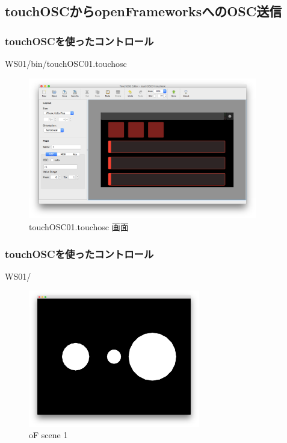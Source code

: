\documentclass[10pt, dvipdfmx]{beamer}
\begin{document}
    \subsection{touchOSCからopenFrameworksへのOSC送信}
        \begin{frame}
            \frametitle{touchOSCを使ったコントロール}
                \tiny
                WS01/bin/touchOSC01.touchosc
                \begin{figure}[htb]
                    \includegraphics[width=100mm]{images/touch-2.png}
                    \caption{touchOSC01.touchosc 画面}
                    \label{fig:touch-2}
                \end{figure}
        \end{frame}

        \begin{frame}
            \frametitle{touchOSCを使ったコントロール}
                \tiny
                WS01/
                \begin{figure}[htb]
                    \includegraphics[width=75mm]{images/touch-3.png}
                    \caption{oF scene 1}
                    \label{fig:touch-3}
                \end{figure}
        \end{frame}
\end{document}

